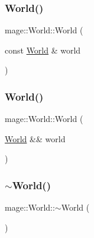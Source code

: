\hypertarget{classmage_1_1_world_a28e20e33499cd57282cefa5ab0fda041}{}\label{classmage_1_1_world_a28e20e33499cd57282cefa5ab0fda041} 
\subsubsection{\texorpdfstring{World()}{World()}\hspace{0.1cm}{\footnotesize\ttfamily [2/3]}}
{\footnotesize\ttfamily mage\+::\+World\+::\+World (\begin{DoxyParamCaption}\item[{const \hyperlink{classmage_1_1_world}{World} \&}]{world }\end{DoxyParamCaption})\hspace{0.3cm}{\ttfamily [delete]}}

\hypertarget{classmage_1_1_world_a6170766c5b83465cfdbf847e67315d91}{}\label{classmage_1_1_world_a6170766c5b83465cfdbf847e67315d91} 
\subsubsection{\texorpdfstring{World()}{World()}\hspace{0.1cm}{\footnotesize\ttfamily [3/3]}}
{\footnotesize\ttfamily mage\+::\+World\+::\+World (\begin{DoxyParamCaption}\item[{\hyperlink{classmage_1_1_world}{World} \&\&}]{world }\end{DoxyParamCaption})\hspace{0.3cm}{\ttfamily [default]}}

\hypertarget{classmage_1_1_world_a8f594ba33a69c4142d599e548337bbcf}{}\label{classmage_1_1_world_a8f594ba33a69c4142d599e548337bbcf} 
\subsubsection{\texorpdfstring{$\sim$\+World()}{~World()}}
{\footnotesize\ttfamily mage\+::\+World\+::$\sim$\+World (\begin{DoxyParamCaption}{ }\end{DoxyParamCaption})}




